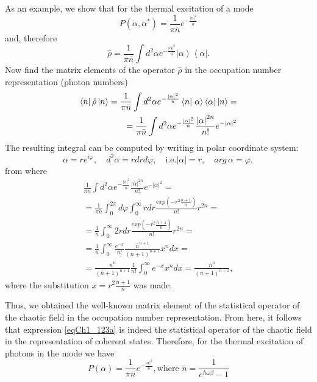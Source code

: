 As an example, we show that for the thermal excitation of a mode 
\begin{equation}
P\left(\alpha, \alpha^{*}\right) = \frac{1}{\pi \bar{n}}
e^{- \frac{\left|\alpha\right|^2}{\bar{n}}}
\label{eqCh1_123a}
\end{equation}
and, therefore
\[
\hat{\rho} = \frac{1}{\pi \bar{n}}
\int d^2 \alpha 
e^{- \frac{\left|\alpha\right|^2}{\bar{n}}}
\left|\alpha\right>
\left<\alpha\right|.
\]
Now find the matrix elements of the operator $\hat{\rho}$ in the occupation number representation (photon numbers)
\begin{eqnarray}
\bra{n}
\hat{\rho}
\ket{n} = 
\frac{1}{\pi \bar{n}}
\int d^2 \alpha 
e^{- \frac{\left|\alpha\right|^2}{\bar{n}}}
\bra{n}\left.\alpha\right>
\left<\alpha\right|
\ket{n} = 
\nonumber \\
= 
\frac{1}{\pi \bar{n}}
\int d^2 \alpha 
e^{- \frac{\left|\alpha\right|^2}{\bar{n}}}
\frac{\left|\alpha\right|^{2n}}{n!} 
e^{- \left|\alpha\right|^2} 
\nonumber 
\end{eqnarray}
The resulting integral can be computed by writing in polar coordinate system:
\[
\alpha = r e^{i \varphi}, \quad 
d^2 \alpha = r d r d \varphi , \quad 
\mbox{i.e.} 
\left|\alpha\right| = r, \quad arg\,\alpha = \varphi,
\]
from where
\begin{eqnarray}
\frac{1}{\pi \bar{n}}
\int d^2 \alpha 
e^{- \frac{\left|\alpha\right|^2}{\bar{n}}}
\frac{\left|\alpha\right|^{2n}}{n!} 
e^{- \left|\alpha\right|^2} =
\nonumber \\
=
\frac{1}{\pi \bar{n}}
\int_0^{2 \pi} d \varphi 
\int_0^{\infty}
r dr \frac{exp \left(- r^2\frac{\bar{n} + 1}{\bar{n}}\right)}{n!} r^{2n}= 
\nonumber \\
= 
\frac{1}{\bar{n}}
\int_0^{\infty}
2 r dr \frac{exp \left(- r^2\frac{\bar{n} + 1}{\bar{n}}\right)}{n!}  r^{2n} = 
\nonumber \\
= 
\frac{1}{\bar{n}}
\int_0^{\infty}
\frac{e^{-x}}{n!}\frac{\bar{n}^{n + 1}}
{\left(\bar{n} + 1\right)^{n + 1}}x^n dx = 
\nonumber \\
=
\frac{\bar{n}^{n}}
{\left(\bar{n} + 1\right)^{n + 1}}
\frac{1}{n!}
\int_0^{\infty}
e^{-x}x^n dx = 
\frac{\bar{n}^{n}}
{\left(\bar{n} + 1\right)^{n + 1}},
\label{eqCh1_matrelemRho}
\end{eqnarray}
where the substitution $x = r^2\frac{\bar{n} + 1}{\bar{n}}$ was made.

Thus, we obtained the well-known matrix element of the statistical operator of the chaotic field in the occupation number representation. From here, it follows that expression \eqref{eqCh1_123a} is indeed the statistical operator of the chaotic field in the representation of coherent states. Therefore, for the thermal excitation of photons in the mode we have
\begin{equation}
P\left(\alpha\right) = \frac{1}{\pi \bar{n}}
e^{-\frac{\left|\alpha\right|^2}{\bar{n}}},
\mbox{where }
\bar{n} = \frac{1}{e^{\hbar \omega \beta} - 1}
\label{eqCh1_task4}
\end{equation}
  
